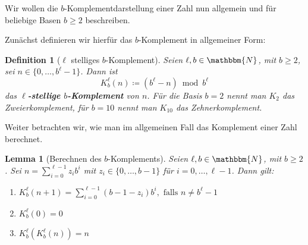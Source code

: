 \documentclass{article}
\newcommand{\N}{\mathbbm{N}} %
\newtheorem{definition}[satz]{Definition}
\newtheorem{lemma}[satz]{Lemma}
\begin{document}
  Wir wollen die $b$-Komplementdarstellung einer Zahl nun allgemein und für beliebige Basen $b \geq 2$ beschreiben.

  Zunächst definieren wir hierfür das $b$-Komplement in allgemeiner Form:

  \begin{definition}[$\ell$ stelliges $b$-Komplement] \label{def:b-Komplement}
    Seien $\ell,b \in \N$, mit $b\geq 2$, sei $n \in \{0, \dots, b^\ell-1\}$.
    Dann ist 
    \[K^\ell_b(n) \coloneq (b^\ell-n) \bmod b^\ell\]
    das \textbf{$\ell$-stellige $b$-Komplement} von $n$.
    Für die Basis $b=2$ nennt man $K_2$ das Zweierkomplement, für $b=10$ nennt man $K_{10}$ das Zehnerkomplement.
  \end{definition}
  
  Weiter betrachten wir, wie man im allgemeinen Fall das Komplement einer Zahl berechnet.

  \begin{lemma}[Berechnen des $b$-Komplements] \label{lem:b-Komplement_berechnen}
    Seien $\ell,b \in \N$, mit $b\geq 2$. Sei $n=\displaystyle\sum_{i=0}^{\ell-1} z_ib^i$ mit $z_i \in \{0, \dots, b-1\}$ für $i = 0, \dots, \ell-1$.
    Dann gilt:
    \begin{enumerate}[label=(\roman*)]
      \item $K^\ell_b(n+1) = \displaystyle\sum_{i=0}^{\ell-1}(b-1-z_i)b^i, \text{ falls } n\neq b^\ell-1$ \label{lem:b-Komplement_berechnen_Berechnung}
      \item $K^\ell_b(0)=0$ \label{lem:b-Komplement_berechnen_von0} 
      \item $K^\ell_b(K^\ell_b(n))=n$ \label{lem:b-Komplement_berechnen_KomplementKomplement} 
    \end{enumerate}
  \end{lemma}
\end{document}
